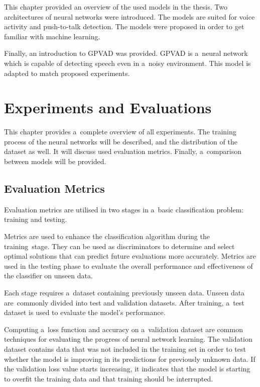     \vspace{0.2cm}


    This chapter provided an overview of the used models in the thesis. Two architectures of neural networks were introduced. The models are suited for voice activity and push-to-talk detection. The models were proposed in order to get familiar with machine learning. 

    Finally, an introduction to GPVAD was provided. GPVAD is a~neural network which is capable of detecting speech even in a~noisy environment. This model is adapted to match proposed experiments. 


    

\chapter{Experiments and Evaluations}\label{Experiments}

    This chapter provides a~complete overview of all experiments. The training process of the neural networks will be described, and the distribution of the dataset as well. It will discuss used evaluation metrics. Finally, a~comparison between models will be provided. 

\section{Evaluation Metrics}\label{Eval Metrics}

    Evaluation metrics are utilised in two stages in a~basic classification problem: training and testing. 
    
    Metrics are used to enhance the classification algorithm during the training stage. They can be used as discriminators to determine and select optimal solutions that can predict future evaluations more accurately.  
    Metrics are used in the testing phase to evaluate the overall performance and effectiveness of the classifier on unseen data. 
    
    Each stage requires a~dataset containing previously unseen data. Unseen data are commonly divided into test and validation datasets. After training, a~test dataset is used to evaluate the model's performance. 

    Computing a~loss function and accuracy on a~validation dataset are common techniques for evaluating the progress of neural network learning. The validation dataset contains data that was not included in the training set in order to test whether the model is improving in its predictions for previously unknown data. If the validation loss value starts increasing, it indicates that the model is starting to overfit the training data and that training should be interrupted.

